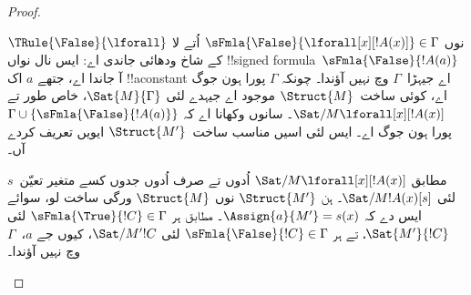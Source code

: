 \documentclass[../../../include/open-logic-section]{subfiles}
\begin{document}
\begin{proof}
\begin{enumerate}
{\item $\TRule{\False}{\lforall}$ نوں
  $\sFmla{\False}{\lforall[x][!A(x)]} \in \Gamma$ اُتے لا کے شاخ ودھائی جاندی اے: ایس نال
  نواں !!{signed formula}~$\sFmla{\False}{!A(a)}$ آ جاندا اے،
  جتھے $a$ اک !!a{constant} اے جیہڑا~$\Gamma$ وچ نہیں آؤندا۔
  چونکہ $\Gamma$ پورا ہون جوگ اے، کوئی ساخت~$\Struct{M}$ موجود اے
  جیہدے لئی $\Sat{M}{\Gamma}$، خاص طور تے
  $\Sat/{M}{\lforall[x][!A(x)]}$۔ سانوں وکھانا اے کہ
  $\Gamma \cup \{\sFmla{\False}{!A(a)}\}$ پورا ہون جوگ اے۔
  ایس لئی اسیں مناسب ساخت~$\Struct{M'}$ ایویں تعریف کردے آں۔

   مطابق
  $\Sat/{M}{\lforall[x][!A(x)]}$ اُدوں تے صرف اُدوں جدوں کسے
  متغیر تعیّن~$s$ لئی $\Sat/{M}{!A(x)}[s]$۔ ہن $\Struct{M'}$
  نوں $\Struct{M}$ ورگی ساخت لو، سوائے ایس دے کہ
  $\Assign{a}{M'} = s(x)$۔
   مطابق ہر
  $\sFmla{\True}{!C} \in \Gamma$ لئی $\Sat{M'}{!C}$، تے ہر
  $\sFmla{\False}{!C} \in \Gamma$ لئی $\Sat/{M'}{!C}$، کیوں جے
  $a$،~$\Gamma$ وچ نہیں آؤندا۔

}
\end{enumerate}
\end{proof}
\end{document}
